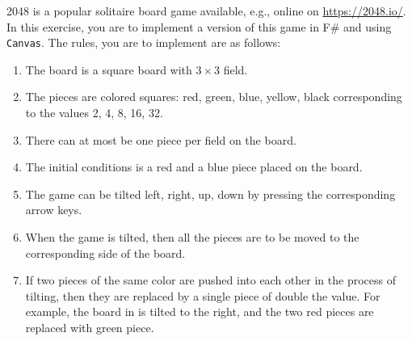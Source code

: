 2048 is a popular solitaire board game available, e.g., online on \url{https://2048.io/}. In this exercise, you are to implement a version of this game in F\# and using \lstinline{Canvas}. The rules, you are to implement are as follows:
\begin{enumerate}
\item The board is a square board with $3\times 3$ field.
\item The pieces are colored squares: red, green, blue, yellow, black corresponding to the values 2, 4, 8, 16, 32.
\item There can at most be one piece per field on the board.
\item The initial conditions is a red and a blue piece placed on the board.
\item The game can be tilted left, right, up, down by pressing the corresponding arrow keys.
\item When the game is tilted, then all the pieces are to be moved to the corresponding side of the board.
\item If two pieces of the same color are pushed into each other in the process of tilting, then they are replaced by a single piece of double the value. For example, the board in  is tilted to the right, and the two red pieces are replaced with green piece.
  \begin{figure}
    \centering

\end{figure}
\end{enumerate}
